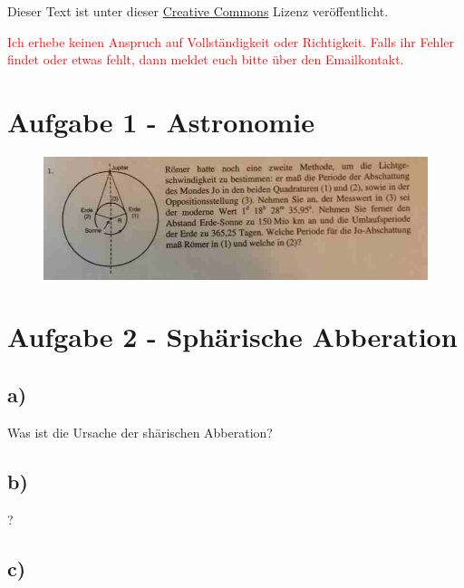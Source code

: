 




\maketitle

Dieser Text ist unter dieser \href{http://creativecommons.org/licenses/by-nc-sa/4.0/}{Creative Commons} Lizenz veröffentlicht.

\textcolor{red}{Ich erhebe keinen Anspruch auf Vollständigkeit oder Richtigkeit. Falls ihr Fehler findet oder etwas fehlt, dann meldet euch bitte über den Emailkontakt.}

\tableofcontents


\newpage



\section{Aufgabe 1 - Astronomie}

\begin{figure}[h]
	\centering
	\includegraphics[scale=0.6]{A1_1.jpg}
\end{figure}

\section{Aufgabe 2 - Sphärische Abberation}

\subsection*{a)}

Was ist die Ursache der shärischen Abberation?

\subsection*{b)}

?

\subsection*{c)}

